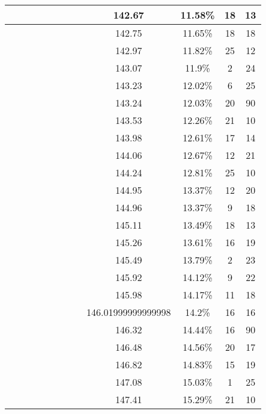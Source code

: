 \begin{center}
\begin{longtable}{|c|c|c|c|c|c|c|c|c|c|c|c|}
 \x &  &  \x &  &  &  \x &  &  \x & 142.67 & 11.58\% & 18 & 13 \\ \hline
 \x &  \x &  \x &  &  \x &  &  &  & 142.75 & 11.65\% & 18 & 18 \\ \hline
 \x &  &  \x &  \x &  \x &  \x &  &  \x & 142.97 & 11.82\% & 25 & 12 \\ \hline
 \x &  \x &  &  &  \x &  &  &  \x & 143.07 & 11.9\% & 2 & 24 \\ \hline
 \x &  \x &  \x &  &  &  &  \x &  \x & 143.23 & 12.02\% & 6 & 25 \\ \hline
 \x &  &  \x &  \x &  &  \x &  &  \x & 143.24 & 12.03\% & 20 & 90 \\ \hline
 \x &  \x &  &  \x &  &  &  &  \x & 143.53 & 12.26\% & 21 & 10 \\ \hline
 \x &  \x &  &  &  \x &  &  &  & 143.98 & 12.61\% & 17 & 14 \\ \hline
 \x &  \x &  \x &  &  \x &  &  &  \x & 144.06 & 12.67\% & 12 & 21 \\ \hline
 \x &  \x &  \x &  &  &  \x &  \x &  & 144.24 & 12.81\% & 25 & 10 \\ \hline
 \x &  &  &  \x &  \x &  \x &  &  & 144.95 & 13.37\% & 12 & 20 \\ \hline
 \x &  \x &  \x &  &  \x &  \x &  &  & 144.96 & 13.37\% & 9 & 18 \\ \hline
 \x &  &  &  &  &  \x &  &  \x & 145.11 & 13.49\% & 18 & 13 \\ \hline
 \x &  \x &  &  \x &  \x &  \x &  &  & 145.26 & 13.61\% & 16 & 19 \\ \hline
 \x &  \x &  \x &  \x &  &  &  &  \x & 145.49 & 13.79\% & 2 & 23 \\ \hline
 \x &  &  \x &  &  \x &  \x &  \x &  & 145.92 & 14.12\% & 9 & 22 \\ \hline
 \x &  &  \x &  &  \x &  &  \x &  \x & 145.98 & 14.17\% & 11 & 18 \\ \hline
 \x &  &  \x &  &  &  &  \x &  \x & 146.01999999999998 & 14.2\% & 16 & 16 \\ \hline
 \x &  \x &  \x &  \x &  &  &  \x &  \x & 146.32 & 14.44\% & 16 & 90 \\ \hline
 \x &  &  \x &  \x &  &  &  &  \x & 146.48 & 14.56\% & 20 & 17 \\ \hline
 \x &  &  \x &  &  \x &  &  &  & 146.82 & 14.83\% & 15 & 19 \\ \hline
 \x &  \x &  &  &  &  &  \x &  \x & 147.08 & 15.03\% & 1 & 25 \\ \hline
 \x &  &  &  \x &  &  &  &  & 147.41 & 15.29\% & 21 & 10 \\ \hline

\end{longtable}
\end{center}
